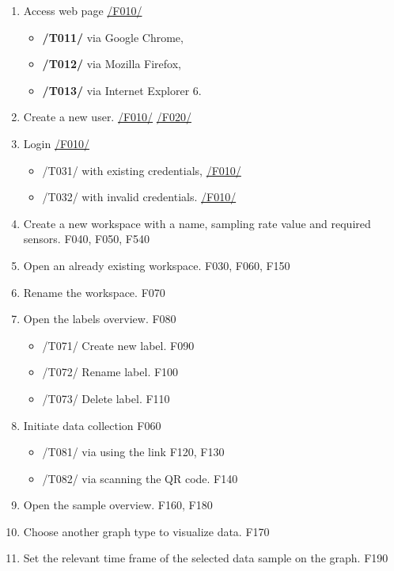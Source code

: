 \begin{enumerate}[{label = \textbf{/T{\protect\twodigits{\arabic{enumi}}}0/}, leftmargin = *}]
    \item Access web page \hyperref[welcome_page]{/F010/}
    \begin{itemize}
        \item \textbf{/T011/} via Google Chrome,
        \item \textbf{/T012/} via Mozilla Firefox,
        \item \textbf{/T013/} via Internet Explorer 6.
    \end{itemize}
    \item Create a new user. \hyperref[welcome_page]{/F010/} \hyperref[registration_panel]{/F020/}
    \item Login \hyperref[welcome_page]{/F010/}
    \begin{itemize}
        \item /T031/ with existing credentials, \hyperref[welcome_page]{/F010/}
        \item /T032/ with invalid credentials. \hyperref[welcome_page]{/F010/}
    \end{itemize}
    \item Create a new workspace with a name, sampling rate value and required sensors. F040, F050, F540
    \item Open an already existing workspace. F030, F060, F150
    \item Rename the workspace. F070
    \item Open the labels overview. F080
    \begin{itemize}
        \item /T071/ Create new label. F090
        \item /T072/ Rename label. F100
        \item /T073/ Delete label. F110
    \end{itemize}
    \item Initiate data collection F060
    \begin{itemize}
        \item /T081/ via using the link F120, F130
        \item /T082/ via scanning the QR code. F140
    \end{itemize}
    \item Open the sample overview. F160, F180
    \item Choose another graph type to visualize data. F170
    \item Set the relevant time frame of the selected data sample on the graph. F190

\end{enumerate}
